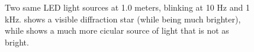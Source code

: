 \begin{figure}[H]
	\centering
	\caption{
  Two same LED light sources at 1.0 meters, blinking at 10 Hz and 1 kHz.
   shows a visible diffraction star (while being much brighter), while  shows a
  much more cicular source of light that is not as bright.
  }
	\label{fig:stars}
\end{figure}